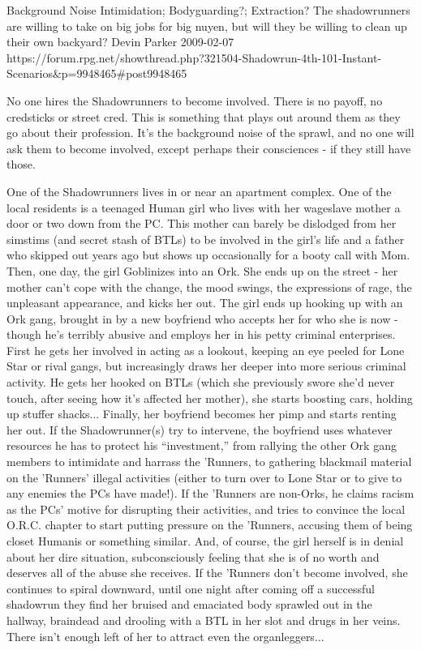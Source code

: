 \begin{scenario}{Background Noise}
	{Intimidation; Bodyguarding?; Extraction?}
	{The shadowrunners are willing to take on big jobs for big nuyen, but will they be willing to clean up their own backyard?}
	{Devin Parker}
	{2009-02-07}
	{https://forum.rpg.net/showthread.php?321504-Shadowrun-4th-101-Instant-Scenarios\&p=9948465\#post9948465}

No one hires the Shadowrunners to become involved. There is no payoff, no credsticks or street cred. This is something that plays out around them as they go about their profession. It's the background noise of the sprawl, and no one will ask them to become involved, except perhaps their consciences - if they still have those.

\synopsis One of the Shadowrunners lives in or near an apartment complex. One of the local residents is a teenaged Human girl who lives with her wageslave mother a door or two down from the PC. This mother can barely be dislodged from her simstims (and secret stash of BTLs) to be involved in the girl's life and a father who skipped out years ago but shows up occasionally for a booty call with Mom. Then, one day, the girl Goblinizes into an Ork. She ends up on the street - her mother can't cope with the change, the mood swings, the expressions of rage, the unpleasant appearance, and kicks her out. The girl ends up hooking up with an Ork gang, brought in by a new boyfriend who accepts her for who she is now - though he's terribly abusive and employs her in his petty criminal enterprises. First he gets her involved in acting as a lookout, keeping an eye peeled for Lone Star or rival gangs, but increasingly draws her deeper into more serious criminal activity. He gets her hooked on BTLs (which she previously swore she'd never touch, after seeing how it's affected her mother), she starts boosting cars, holding up stuffer shacks... Finally, her boyfriend becomes her pimp and starts renting her out. If the Shadowrunner(s) try to intervene, the boyfriend uses whatever resources he has to protect his ``investment,'' from rallying the other Ork gang members to intimidate and harrass the 'Runners, to gathering blackmail material on the 'Runners' illegal activities (either to turn over to Lone Star or to give to any enemies the PCs have made!). If the 'Runners are non-Orks, he claims racism as the PCs' motive for disrupting their activities, and tries to convince the local O.R.C. chapter to start putting pressure on the 'Runners, accusing them of being closet Humanis or something similar. And, of course, the girl herself is in denial about her dire situation, subconsciously feeling that she is of no worth and deserves all of the abuse she receives. If the 'Runners don't become involved, she continues to spiral downward, until one night after coming off a successful shadowrun they find her bruised and emaciated body sprawled out in the hallway, braindead and drooling with a BTL in her slot and drugs in her veins. There isn't enough left of her to attract even the organleggers...


\end{scenario}
